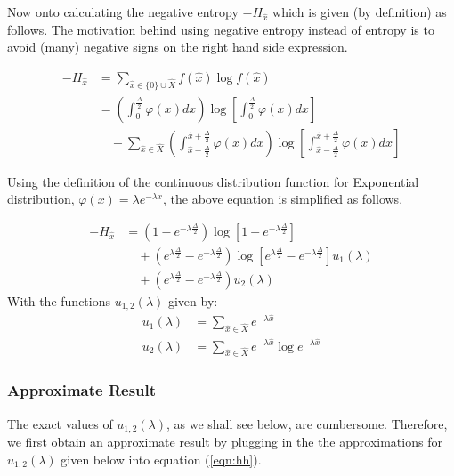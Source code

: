 Now onto calculating the negative entropy $-H_{\hat{x}}$ which is given (by definition) as follows. The motivation behind using negative entropy instead of entropy is to avoid (many) negative signs on the right hand side expression.

\begin{align}-H_{\hat{x}} &= \sum_{\hat{x} \in \{0\} \cup \hat{X}} f(\hat{x}) \log f(\hat{x}) \\ &= \left(\int_{0}^{\frac{\Delta}{2}} \varphi(x) dx \right) \log \left[\int_{0}^{\frac{\Delta}{2}} \varphi(x) dx \right] \nonumber \\ &\quad + \sum_{\hat{x} \in \hat{X}} \left( \int_{\hat{x}-\frac{\Delta}{2}}^{\hat{x}+\frac{\Delta}{2}} \varphi(x) dx \right) \log \left[\int_{\hat{x}-\frac{\Delta}{2}}^{\hat{x}+\frac{\Delta}{2}} \varphi(x) dx \right]\end{align} 

Using the definition of the continuous distribution function for Exponential distribution, $\varphi(x) = \lambda e^{-\lambda x}$, the above equation is simplified as follows.

\begin{align} -H_{\hat{x}} &= \left(1-e^{-\lambda\frac{\Delta}{2}}\right) \log \left[ 1-e^{-\lambda\frac{\Delta}{2}} \right] \nonumber \\ &\quad + \left(e^{\lambda\frac{\Delta}{2}} - e^{-\lambda\frac{\Delta}{2}}\right) \log \left[e^{\lambda\frac{\Delta}{2}} - e^{-\lambda\frac{\Delta}{2}} \right] u_1(\lambda) \nonumber \\ &\quad +  \left(e^{\lambda\frac{\Delta}{2}} - e^{-\lambda\frac{\Delta}{2}}\right) u_2(\lambda) \label{eqn:hh} \end{align}
With the functions $u_{1,2}(\lambda)$ given by:
\begin{align} u_1(\lambda) &= \sum_{\hat{x} \in \hat{X}} e^{-\lambda\hat{x}} \\ u_2(\lambda) &= \sum_{\hat{x} \in \hat{X}} e^{-\lambda\hat{x}} \log e^{-\lambda\hat{x}} \end{align}

\subsubsection{Approximate Result}

The exact values of $u_{1,2}(\lambda)$, as we shall see below, are cumbersome. Therefore, we first obtain an approximate result by plugging in the the approximations for $u_{1,2}(\lambda)$ given below into equation (\ref{eqn:hh}).

